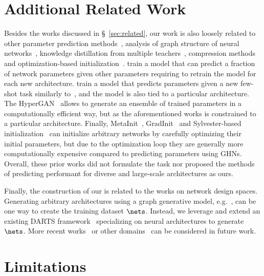 \section{Additional Related Work\label{apdx:related_work}}

Besides the works discussed in \S~\ref{sec:related}, our work is also loosely related to other parameter prediction methods~\cite{Denil2013-la,bertinetto2016learning,ratzlaff2019hypergan}, analysis of graph structure of neural networks~\cite{you2020graph}, knowledge distillation from multiple teachers~\cite{liu2019knowledge}, compression methods~\cite{cheng2017survey} and optimization-based initialization~\cite{dauphin2019metainit,zhu2021gradinit,das2021data}. \citet{Denil2013-la} train a model that can predict a fraction of network parameters given other parameters requiring to retrain the model for each new architecture.
\citet{bertinetto2016learning} train a model that predicts parameters given a new few-shot task similarly to~\cite{ravi2016optimization,requeima2019fast}, and the model is also tied to a particular architecture.
The HyperGAN~\cite{ratzlaff2019hypergan} allows to generate an ensemble of trained parameters in a computationally efficient way, but as the aforementioned works is constrained to a particular architecture.
Finally, MetaInit~\cite{dauphin2019metainit}, GradInit~\cite{zhu2021gradinit} and Sylvester-based initialization~\cite{das2021data} can initialize arbitrary networks by carefully optimizing their initial parameters, but due to the optimization loop they are generally more computationally expensive compared to predicting parameters using GHNs.
Overall, these prior works did not formulate the task nor proposed the methods of predicting performant \params for diverse and large-scale architectures as ours.

Finally, the construction of our \dataset is related to the works on network design spaces. Generating arbitrary architectures using a graph generative model, e.g.~\cite{yu2019dag,guo2020systematic,you2020graph}, can be one way to create the training dataset $\nets$. Instead, we leverage and extend an existing DARTS framework~\cite{liu2018darts} specializing on neural architectures to generate $\nets$. 
More recent works~\cite{radosavovic2020designing} or other domains~\cite{you2020design} can be considered in future work.

\section{Limitations\label{sec:limit}}

